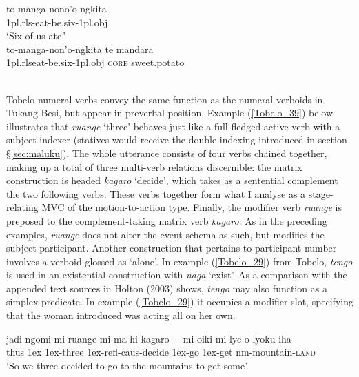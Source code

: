\pex \label{Tukang_37}
\a
\gll to-manga-nono'o-ngkita \\
1\acs{pl}.\acs{rls}-eat-be.six-1\acs{pl}.\acs{obj} \\
\glft `Six of us ate.' \\ 
\z
\a
\gll *to-manga-non'o-ngkita te mandara \\ 
1\acs{pl}.\acs{rls}eat-be.six-1\acs{pl}.\acs{obj} \textsc{core} sweet.potato \\
\glft  {}\\ 
\z
\xe

Tobelo numeral verbs convey the same function as the numeral verboids in Tukang Besi, but appear in preverbal position. Example (\ref{Tobelo_39}) below illustrates that \textit{ruange} `three' behaves just like a full-fledged active verb with a subject indexer (statives would receive the double indexing introduced in section §\ref{sec:maluku}). The whole utterance consists of four verbs chained together, making up a total of three multi-verb relations discernible: the matrix construction is headed \textit{kagaro} `decide', which takes as a sentential complement the two following verbs. These verbs together form what I analyse as a stage-relating MVC of the motion-to-action type. Finally, the modifier verb \textit{ruange} is preposed to the complement-taking matrix verb \textit{kagaro}. As in the preceding examples, \textit{ruange} does not alter the event schema as such, but modifies the subject participant. Another construction that pertains to participant number involves a verboid glossed as `alone'. In example (\ref{Tobelo_29}) from Tobelo, \textit{tengo} is used in an existential construction with \textit{naga} `exist'. As a comparison with the appended text sources in Holton (2003) shows, \textit{tengo} may also function as a simplex predicate. In example (\ref{Tobelo_29}) it occupies a modifier slot, specifying that the woman introduced was acting all on her own. 

\ea \label{Tobelo_39}
\gll jadi  ngomi mi-ruange mi-ma-hi-kagaro + mi-oiki mi-lye o-lyoku-iha \\
thus 1\acs{ex} 1\acs{ex}-three 1\acs{ex}-\acs{refl}-\acs{caus}-decide 1\acs{ex}-go 1\acs{ex}-get \acs{nm}-mountain-\textsc{land} \\
\glft `So we three decided to go to the mountains to get some' \\ 
\z
\xe

